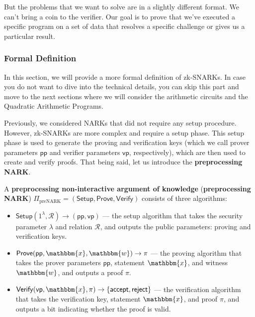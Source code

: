 \documentclass[../lecture-notes-148x210.tex]{subfiles}
\begin{document}
But the problems that we want to solve are in a slightly different format. We can't bring a coin to
the verifier. Our goal is to prove that we've executed a specific program on a set of data that 
resolves a specific challenge or gives us a particular result.

\subsubsection{Formal Definition}

In this section, we will provide a more formal definition of zk-SNARKs. In case you do not want to
dive into the technical details, you can skip this part and move to the next sections where we will
consider the arithmetic circuits and the Quadratic Arithmetic Programs.

Previously, we considered NARKs that did not require any setup procedure. However, zk-SNARKs are
more complex and require a setup phase. This setup phase is used to generate the proving and
verification keys (which we call prover parameters $\mathsf{pp}$ and verifier parameters $\mathsf{vp}$, respectively), 
which are then used to create and verify proofs. That being said, let us introduce the \textbf{preprocessing NARK}.

\begin{definition}
    A \textbf{preprocessing non-interactive argument of knowledge}
    (\textbf{preprocessing NARK})
    $\Pi_{\text{preNARK}}=(\mathsf{Setup},\mathsf{Prove},\mathsf{Verify})$
    consists of three algorithms:
    \begin{itemize}
        \item $\mathsf{Setup}(1^\lambda, \mathcal{R}) \rightarrow (\mathsf{pp},
        \mathsf{vp})$ --- the setup algorithm that takes the security parameter
        $\lambda$ and relation $\mathcal{R}$, and outputs the public parameters:
        proving and verification keys.
        \item $\mathsf{Prove}(\mathsf{pp}, \mathbbm{x}, \mathbbm{w}) \rightarrow
        \pi$ --- the proving algorithm that takes the prover parameters
        $\mathsf{pp}$, statement $\mathbbm{x}$, and witness $\mathbbm{w}$, and outputs a proof
        $\pi$.
        \item $\mathsf{Verify}(\mathsf{vp}, \mathbbm{x}, \pi) \rightarrow
        \{\mathsf{accept}, \mathsf{reject}\}$ --- the verification algorithm
        that takes the verification key, statement $\mathbbm{x}$, and proof
        $\pi$, and outputs a bit indicating whether the proof is valid.
    \end{itemize}
\end{definition}
\end{document}
